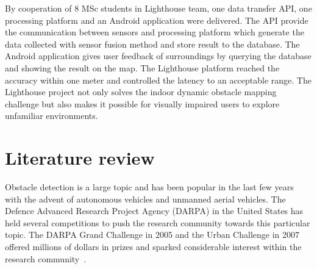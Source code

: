 \documentclass[prodmode,acmtosem]{acmsmall} %
\begin{document}
By cooperation of 8 MSc students in Lighthouse team, one data transfer API, one processing platform and an Android application were delivered. The API provide the communication between sensors and processing platform which generate the data collected with sensor fusion method and store result to the database. The Android application gives user feedback of surroundings by querying the database and showing the result on the map.
The Lighthouse platform reached the accuracy within one meter and controlled the latency to an acceptable range. The Lighthouse project not only solves the indoor dynamic obstacle mapping challenge but also makes it possible for visually impaired users to explore unfamiliar environments.


\section{Literature review} %
Obstacle detection is a large topic and has been popular in the last few years with the advent of autonomous vehicles and unmanned aerial vehicles.
The Defence Advanced Research Project Agency (DARPA) in the United States has held several competitions to push the research community towards this particular topic. The DARPA Grand Challenge in 2005 and the Urban Challenge in 2007 offered millions of dollars in prizes and sparked considerable interest within the research community~\cite{DARPAGrandChallenge2005,DARPAUrbanChallenge2007}.
\end{document}
